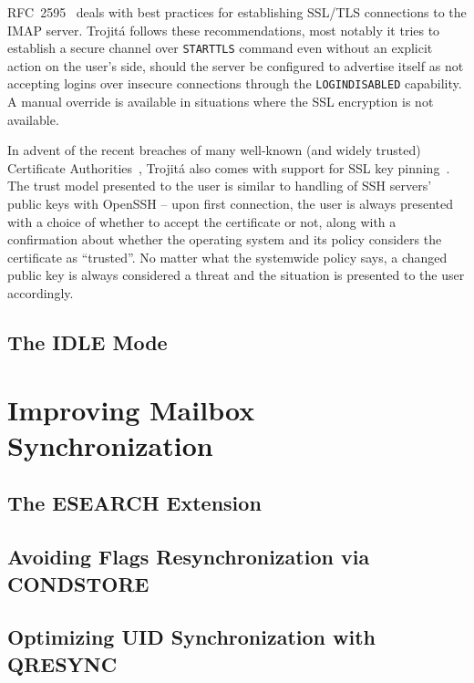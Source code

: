 \documentclass[trojita]{subfiles}
\begin{document}
RFC~2595~\cite{rfc2595} deals with best practices for establishing SSL/TLS connections to the IMAP server.  Trojitá
follows these recommendations, most notably it tries to establish a secure channel over {\tt STARTTLS} command even
without an explicit action on the user's side, should the server be configured to advertise itself as not accepting
logins over insecure connections through the {\tt LOGINDISABLED} capability.  A manual override is available in
situations where the SSL encryption is not available.

In advent of the recent breaches of many well-known (and widely trusted) Certificate Authorities~\cite{ssl-breaches},
Trojitá also comes with support for SSL key pinning~\cite{ssl-pinning}.  The trust model presented to the user is
similar to handling of SSH servers' public keys with OpenSSH -- upon first connection, the user is always presented with
a choice of whether to accept the certificate or not, along with a confirmation about whether the operating system and
its policy considers the certificate as ``trusted''.  No matter what the systemwide policy says, a changed public key is
always considered a threat and the situation is presented to the user accordingly.

\subsection{The IDLE Mode}
\label{sec:imap-idle}

\cite{rfc2177}

\section{Improving Mailbox Synchronization}

\subsection{The ESEARCH Extension}

\cite{rfc4731}

\subsection{Avoiding Flags Resynchronization via CONDSTORE}

\cite{rfc4551}

\subsection{Optimizing UID Synchronization with QRESYNC}
\end{document}
